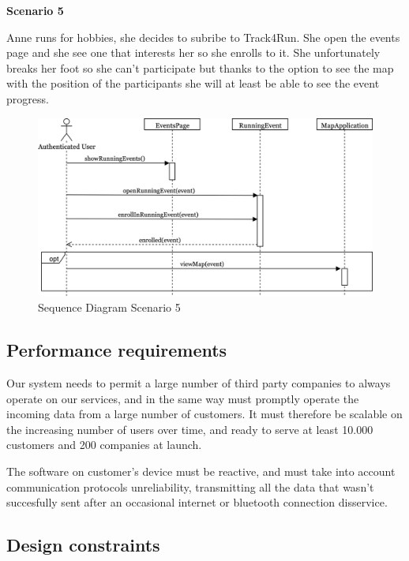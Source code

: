 \documentclass[../main.tex]{subfiles}
\begin{document}
		\begin{minipage}{\textwidth}
			{\bf Scenario 5}
			\vspace{3mm}

			Anne runs for hobbies, she decides to subribe to Track4Run. She open the events page and she see one that interests her so she enrolls to it. She unfortunately breaks her foot so she can't participate but thanks to the option to see the map with the position of the participants she will at least be able to see the event progress.
			\vspace{5mm}
		\end{minipage}
		\begin{figure}[H]
			\centering
			\includegraphics[scale=.08]{images/sequenceDiagram5.png}
			\caption{Sequence Diagram Scenario 5 \label{fig:Sequence Diagram Scenario 5}}
		\end{figure}


\subsection{Performance requirements}

Our system needs to permit a large number of third party companies to always operate on our services, and in the same way must promptly operate the incoming data from a large number of customers. It must therefore be scalable on the increasing number of users over time, and ready to serve at least 10.000 customers and 200 companies at launch.

The software on customer's device must be reactive, and must take into account communication protocols unreliability, transmitting all the data that wasn't succesfully sent after an occasional internet or bluetooth connection disservice.

\subsection{Design constraints}
\end{document}
